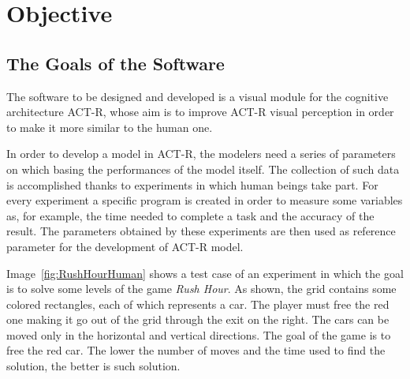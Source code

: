 \chapter{Objective}\label{chObjective}

	\section{The Goals of the Software}
	The software to be designed and developed is a visual module for the cognitive architecture ACT-R, whose aim is to improve ACT-R visual perception in order to make it more similar to the human one. 
	
	In order to develop a model in ACT-R, the modelers need a series of parameters on which basing the performances of the model itself.
	The collection of such data is accomplished thanks to experiments in which human beings take part. 
	For every experiment a specific program is created in order to measure some variables as, for example, the time needed to complete a task and the accuracy of the result.
	The parameters obtained by these experiments are then used as reference parameter for the development of ACT-R model.

 
	Image~\ref{fig:RushHourHuman} shows a test case of an experiment in which the goal is to solve some levels of the game \emph{Rush Hour}. As shown, the grid contains some colored rectangles, each of which represents a car. The player must free the red one making it go out of the grid through the exit on the right. The cars can be moved only in the horizontal and vertical directions. The goal of the game is to free the red car. The lower the number of moves and the time used to find the solution, the better is such solution.

